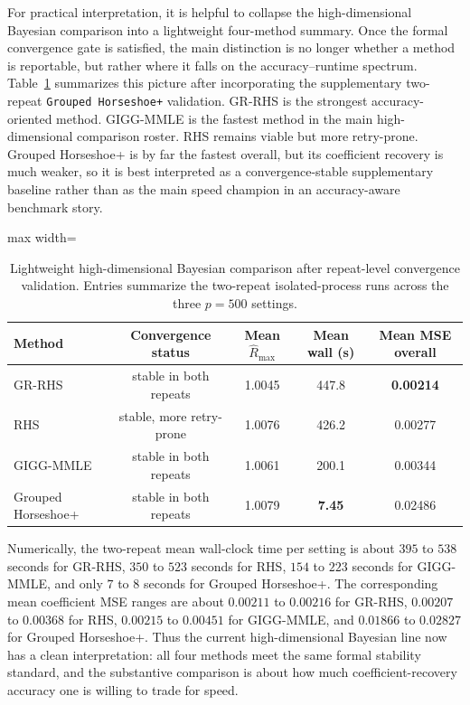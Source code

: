 \documentclass[11pt]{article}
\begin{document}
For practical interpretation, it is helpful to collapse the high-dimensional
Bayesian comparison into a lightweight four-method summary. Once the formal
convergence gate is satisfied, the main distinction is no longer whether a
method is reportable, but rather where it falls on the
accuracy--runtime spectrum. Table~\ref{tab:highdim-all4-light} summarizes this
picture after incorporating the supplementary two-repeat
\texttt{Grouped Horseshoe+} validation. GR-RHS is the strongest
accuracy-oriented method. GIGG-MMLE is the fastest method in the main
high-dimensional comparison roster. RHS remains viable but more retry-prone.
Grouped Horseshoe+ is by far the fastest overall, but its coefficient recovery
is much weaker, so it is best interpreted as a convergence-stable
supplementary baseline rather than as the main speed champion in an
accuracy-aware benchmark story.

\begin{table}[H]
\centering
\caption{Lightweight high-dimensional Bayesian comparison after repeat-level
convergence validation. Entries summarize the two-repeat isolated-process runs
across the three \(p=500\) settings.}
\label{tab:highdim-all4-light}
\begin{adjustbox}{max width=\textwidth}
\begin{tabular}{lcccc}
\toprule
Method & Convergence status & Mean \(\hat R_{\max}\) & Mean wall (s) & Mean MSE overall \\
\midrule
GR-RHS & stable in both repeats & 1.0045 & 447.8 & \textbf{0.00214} \\
RHS & stable, more retry-prone & 1.0076 & 426.2 & 0.00277 \\
GIGG-MMLE & stable in both repeats & 1.0061 & 200.1 & 0.00344 \\
Grouped Horseshoe+ & stable in both repeats & 1.0079 & \textbf{7.45} & 0.02486 \\
\bottomrule
\end{tabular}
\end{adjustbox}
\end{table}

Numerically, the two-repeat mean wall-clock time per setting is about
\(395\) to \(538\) seconds for GR-RHS, \(350\) to \(523\) seconds for RHS,
\(154\) to \(223\) seconds for GIGG-MMLE, and only \(7\) to \(8\) seconds for
Grouped Horseshoe+. The corresponding mean coefficient MSE ranges are about
\(0.00211\) to \(0.00216\) for GR-RHS, \(0.00207\) to \(0.00368\) for RHS,
\(0.00215\) to \(0.00451\) for GIGG-MMLE, and \(0.01866\) to \(0.02827\) for
Grouped Horseshoe+. Thus the current high-dimensional Bayesian line now has a
clean interpretation: all four methods meet the same formal stability standard,
and the substantive comparison is about how much coefficient-recovery accuracy
one is willing to trade for speed.
\end{document}
